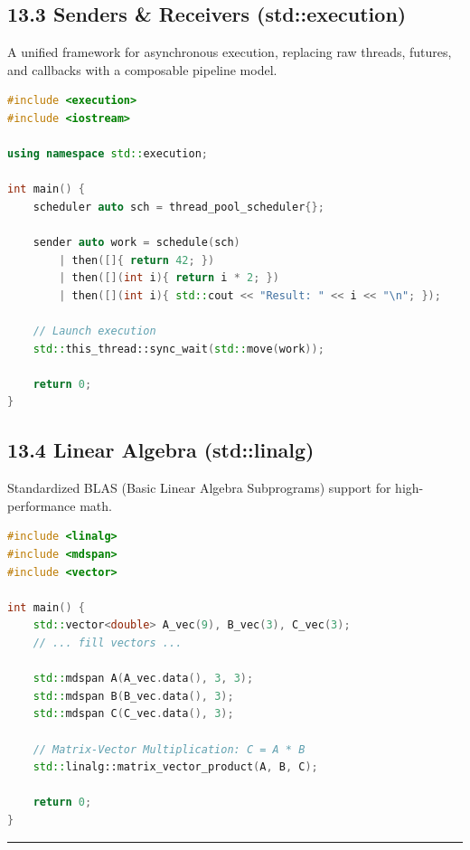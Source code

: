 \hypertarget{senders-receivers-stdexecution}{%
\subsection{13.3 Senders \& Receivers
(std::execution)}\label{senders-receivers-stdexecution}}

A unified framework for asynchronous execution, replacing raw threads,
futures, and callbacks with a composable pipeline model.

\begin{lstlisting}[language={C++}]
#include <execution>
#include <iostream>

using namespace std::execution;

int main() {
    scheduler auto sch = thread_pool_scheduler{};

    sender auto work = schedule(sch)
        | then([]{ return 42; })
        | then([](int i){ return i * 2; })
        | then([](int i){ std::cout << "Result: " << i << "\n"; });

    // Launch execution
    std::this_thread::sync_wait(std::move(work));
    
    return 0;
}
\end{lstlisting}

\hypertarget{linear-algebra-stdlinalg}{%
\subsection{13.4 Linear Algebra
(std::linalg)}\label{linear-algebra-stdlinalg}}

Standardized BLAS (Basic Linear Algebra Subprograms) support for
high-performance math.

\begin{lstlisting}[language={C++}]
#include <linalg>
#include <mdspan>
#include <vector>

int main() {
    std::vector<double> A_vec(9), B_vec(3), C_vec(3);
    // ... fill vectors ...

    std::mdspan A(A_vec.data(), 3, 3);
    std::mdspan B(B_vec.data(), 3);
    std::mdspan C(C_vec.data(), 3);

    // Matrix-Vector Multiplication: C = A * B
    std::linalg::matrix_vector_product(A, B, C);
    
    return 0;
}
\end{lstlisting}

\begin{center}\rule{0.5\linewidth}{0.5pt}\end{center}
